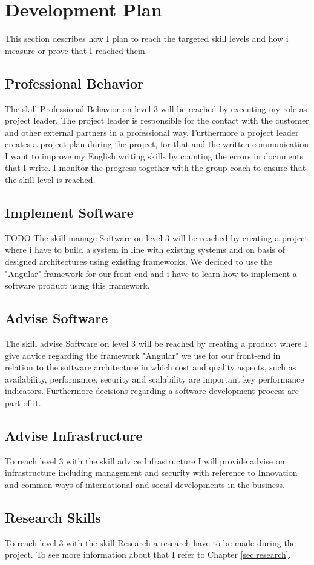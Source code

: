 \section{Development Plan}
\label{sec:development}
This section describes how I plan to reach the targeted skill levels and how i measure or prove that I reached them.

\subsection{Professional Behavior}
The skill Professional Behavior on level 3 will be reached by executing my role as project leader. The project leader is
responsible for the contact with the customer and other external partners in a professional way. 
\newline
Furthermore a project leader creates a project plan during the project, for that and the written communication I want to improve my English writing skills by counting the errors in documents that I write. I monitor the progress together with the group coach to ensure that the skill level is reached.

\subsection{Implement Software}
TODO
The skill manage Software on level 3 will be reached by creating a project where i have to build a system in line with existing systems and on basis of designed architectures 
using existing frameworks. We decided to use the "Angular" framework for our front-end and i have to learn how to implement a software product using this framework.

\subsection{Advise Software}
The skill advise Software on level 3 will be reached by creating a product where I give advice regarding the framework "Angular" we use for our front-end in relation to the software architecture in which cost and quality aspects, such as availability, performance, security and scalability are important key performance indicators. Furthermore decisions regarding a software development process are part of it.   

\subsection{Advise Infrastructure}
To reach level 3 with the skill advice Infrastructure I will provide advise on infrastructure including management and security
with reference to Innovation and common ways of international and social developments in the business.

\subsection{Research Skills}
To reach level 3 with the skill Research a research have to be made during the project. To see more information about that I refer to Chapter \ref{sec:research}.